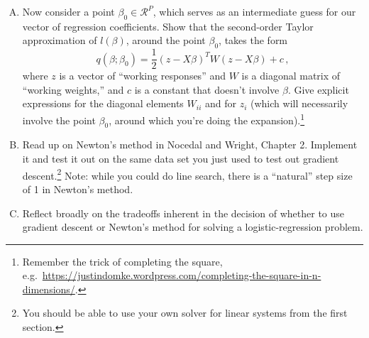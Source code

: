 \documentclass{mynotes}
\begin{document}
\begin{enumerate}[(A)]
\item Now consider a point $\beta_0 \in \mathcal{R}^P$, which serves as an intermediate guess for our vector of regression coefficients.  Show that the second-order Taylor approximation of $l(\beta)$, around the point $\beta_0$, takes the form
$$
q(\beta; \beta_0) = \frac{1}{2}(z - X \beta)^T W (z - X \beta) + c\, ,
$$
where $z$ is a vector of ``working responses'' and $W$ is a diagonal matrix of ``working weights,'' and $c$ is a constant that doesn't involve $\beta$.  Give explicit expressions for the diagonal elements $W_{ii}$ and for $z_i$ (which will necessarily involve the point $\beta_0$, around which you're doing the expansion).\footnote{Remember the trick of completing the square, e.g.~\url{https://justindomke.wordpress.com/completing-the-square-in-n-dimensions/}.}

\item Read up on Newton's method in Nocedal and Wright, Chapter 2.  Implement it and test it out on the same data set you just used to test out gradient descent.\footnote{You should be able to use your own solver for linear systems from the first section.}  Note: while you could do line search, there is a ``natural'' step size of 1 in Newton's method.

\item Reflect broadly on the tradeoffs inherent in the decision of whether to use gradient descent or Newton's method for solving a logistic-regression problem.




\end{enumerate}
\end{document}
